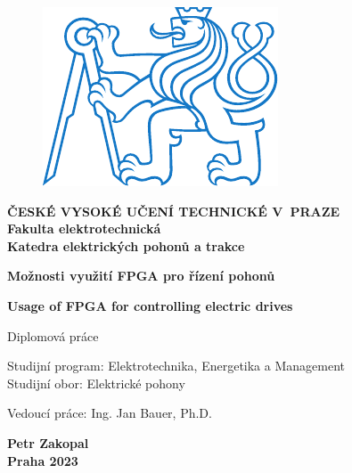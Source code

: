 \documentclass[a4paper, twoside, 11pt]{article}
\begin{document}
\setcounter{figure}{0}

\begin{titlepage}
	\begin{center}

\begin{figure}[H]
	\begin{center}
		\includegraphics[scale=1]{src/misc/symbol_cvut_konturova_verze.pdf}
	\end{center}
\end{figure}
	{\Large{\textbf{ČESKÉ VYSOKÉ UČENÍ TECHNICKÉ V~PRAZE}}}\\
	{\textbf{Fakulta elektrotechnická}}\\
	{\textbf{Katedra elektrických pohonů a trakce}}
	
	\vspace{3cm}
	
	
	{\Large\textbf{Možnosti využití FPGA pro řízení pohonů}}
	
	\vspace{1cm}
	
	{\Large\textbf{Usage of FPGA for controlling electric drives}}
	
	\vspace{2cm}
	
	Diplomová práce\\
	
	\end{center}
	
	\vspace{3cm}
	
	\noindent Studijní program: Elektrotechnika, Energetika a Management\\
	\noindent Studijní obor: Elektrické pohony
	
	\vspace{0.5cm}
	\noindent Vedoucí práce: Ing. Jan Bauer, Ph.D.
	
	\vfill
	
\begin{center}

	\large{\textbf{Petr Zakopal}}\\
	\large{\textbf{Praha 2023}}
	\end{center}
\end{titlepage}
\end{document}
